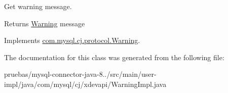 Get warning message.

\begin{DoxyReturn}{Returns}
\mbox{\hyperlink{interfacecom_1_1mysql_1_1cj_1_1xdevapi_1_1_warning}{Warning}} message 
\end{DoxyReturn}


Implements \mbox{\hyperlink{interfacecom_1_1mysql_1_1cj_1_1protocol_1_1_warning_ae984bc89101642345d59a9dac4b32782}{com.\+mysql.\+cj.\+protocol.\+Warning}}.



The documentation for this class was generated from the following file\+:\begin{DoxyCompactItemize}
\item 
pruebas/mysql-\/connector-\/java-\/8../src/main/user-\/impl/java/com/mysql/cj/xdevapi/Warning\+Impl.\+java\end{DoxyCompactItemize}
